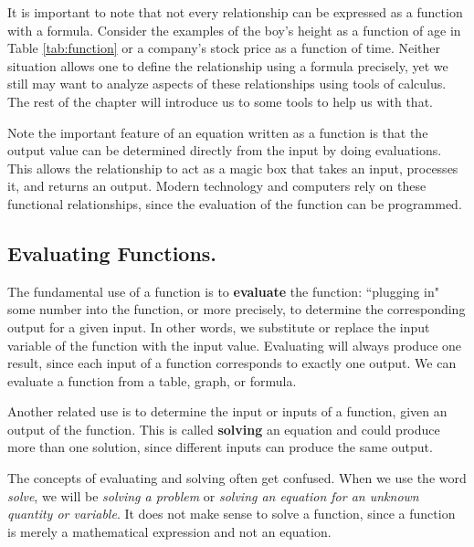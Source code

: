 It is important to note that not every relationship can be expressed as a function with a formula. Consider the examples of the boy's height as a function of age in Table \ref{tab:function} or a company's stock price as a function of time. Neither situation allows one to define the relationship using a formula precisely, yet we still may want to analyze aspects of these relationships using tools of calculus. The rest of the chapter will introduce us to some tools to help us with that.

Note the important feature of an equation written as a function is that the output value can be determined directly from the input by doing evaluations. This allows the relationship to act as a magic box that takes an input, processes it, and returns an output. Modern technology and computers rely on these functional relationships, since the evaluation of the function can be programmed.

\subsection{Evaluating Functions.}

The fundamental use of a function is to {\bf evaluate} the function: ``plugging in" some number into the function, or more precisely, to determine the corresponding output for a given input. In other words, we substitute or replace the input variable of the function with the input value. Evaluating will always produce one result, since each input of a function corresponds to exactly one output. We can evaluate a function from a table, graph, or formula.

Another related use is to determine the input or inputs of a function, given an output of the function. This is called {\bf solving} an equation and could produce more than one solution, since different inputs can produce the same output.

\begin{note}
The concepts of evaluating and solving often get confused. When we use the word {\em solve}, we will be {\em solving a problem} or {\em solving an equation for an unknown quantity or variable}. It does not make sense to solve a function, since a function is merely a mathematical expression and not an equation.
\end{note}

